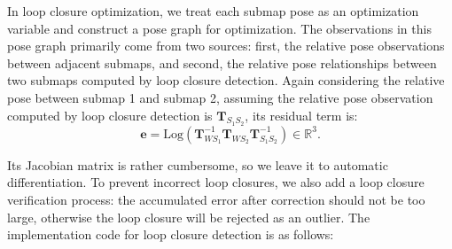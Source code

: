 In loop closure optimization, we treat each submap pose as an optimization variable and construct a pose graph for optimization. The observations in this pose graph primarily come from two sources: first, the relative pose observations between adjacent submaps, and second, the relative pose relationships between two submaps computed by loop closure detection. Again considering the relative pose between submap 1 and submap 2, assuming the relative pose observation computed by loop closure detection is $\bm{T}_{S_1 S_2}$, its residual term is:
\begin{equation}\label{key}
	\bm{e} = \mathrm{Log}( \bm{T}_{W S_1}^{-1} \bm{T}_{W S_2} \bm{T}_{S_1 S_2}^{-1}) \in \mathbb{R}^3.
\end{equation}

Its Jacobian matrix is rather cumbersome, so we leave it to automatic differentiation. To prevent incorrect loop closures, we also add a loop closure verification process: the accumulated error after correction should not be too large, otherwise the loop closure will be rejected as an outlier. The implementation code for loop closure detection is as follows:

